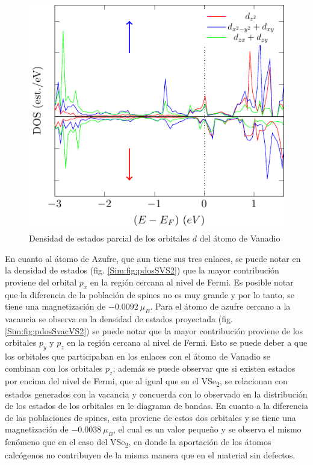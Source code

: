 \begin{figure}[!hbt]
	\centering
	\includegraphics[scale=1]{figRes/VS2/def/bandas/nosoc/pdosV.pdf}
	\caption[Densidad de estados proyectada en los orbitales $d$ del Vanadio en VS\textsubscript{2} con vacancia de Vanadio.]{Densidad de estados parcial de los orbitales $d$ del \'atomo de Vanadio}
	\label{Sim:fig:pdosVvacVS2}
\end{figure}
En cuanto  al \'atomo de Azufre, que aun tiene sus tres enlaces, se puede notar en la densidad de estados (fig. \ref{Sim:fig:pdosSVS2}) que la mayor contribuci\'on proviene del orbital $p_x$ en la regi\'on cercana al nivel de Fermi. Es posible notar que la diferencia de la poblaci\'on de spines no es muy grande y por lo tanto, se tiene una magnetizaci\'on de $-0.0092~\mu_B$. Para el \'atomo de azufre cercano a la vacancia se observa en la densidad de estados proyectada (fig. \ref{Sim:fig:pdosSvacVS2}) se puede notar que la mayor contribuci\'on proviene de los orbitales $p_y$ y $p_z$ en la regi\'on cercana al nivel de Fermi. Esto se puede deber a que los orbitales que participaban en los enlaces con el \'atomo de Vanadio se combinan con los orbitales $p_z$;  adem\'as se puede observar que si existen estados por encima del nivel de Fermi, que al igual que en el VSe\textsubscript{2}, se relacionan con estados generados con la vacancia y concuerda con lo observado en la distribuci\'on de los estados de los orbitales en le diagrama de bandas. En cuanto a la diferencia de las poblaciones de spines, esta proviene de estos dos orbitales y se tiene una magnetizaci\'on de   $-0.0038~\mu_{B}$, el cual es un valor peque\~no y se observa el mismo fen\'omeno que en el caso del VSe\textsubscript{2}, en donde la aportaci\'on de los \'atomos calc\'ogenos no contribuyen de la misma manera que en el material sin defectos.
